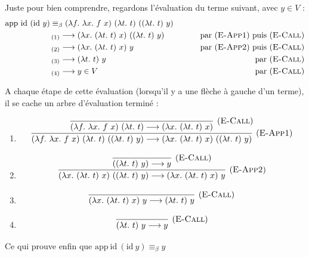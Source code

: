 \documentclass[11pt]{article}
\begin{document}
\begin{example}
    Juste pour bien comprendre, regardons l'évaluation du terme suivant, avec $y\in V$ :
    \begin{equation*}
    \begin{aligned}
        \text{app}~\text{id}~(\text{id}~y) &\equiv_\beta (\lambda f.~\lambda x.~f~x)~(\lambda t.~t)~((\lambda t.~t)~y)\\
        &\,_{(1)}\longrightarrow (\lambda x.~(\lambda t.~t)~x)~((\lambda t.~t)~y)&~~~~~~~\text{par ({\scshape{E-App1}}) puis (\scshape{E-Call})}\\
        &\,_{(2)}\longrightarrow (\lambda x.~(\lambda t.~t)~x)~y&~~~~~~~\text{par ({\scshape{E-App2}}) puis (\scshape{E-Call})}\\
        &\,_{(3)}\longrightarrow (\lambda t.~t)~y&~~~~~~~\text{par (\scshape{E-Call})}\\
        &\,_{(4)}\longrightarrow y\in V&~~~~~~~\text{par (\scshape{E-Call})}\\
    \end{aligned}
    \end{equation*}
    
    A chaque étape de cette évaluation (lorsqu'il y a une flèche à gauche d'un terme), il se cache un arbre d'évaluation terminé :
    \begin{enumerate}
        \item
        $$\infer[(\text{\scshape{E-App1}})] {
        (\lambda f.~\lambda x.~f~x)~(\lambda t.~t)~((\lambda t.~t)~y)\longrightarrow (\lambda x.~(\lambda t.~t)~x)~((\lambda t.~t)~y)
        }
        {
            \infer[(\text{\scshape{E-Call}})]
            {(\lambda f.~\lambda x.~f~x)~(\lambda t.~t)\longrightarrow (\lambda x.~(\lambda t.~t)~x)}
            {}
        }$$

        \item $$
        \infer[(\text{\scshape{E-App2}})]
        {
            (\lambda x.~(\lambda t.~t)~x)~((\lambda t.~t)~y) \longrightarrow (\lambda x.~(\lambda t.~t)~x)~y
        }
        {
            \infer[(\text{\scshape{E-Call}})]
            {
                ((\lambda t.~t)~y)\longrightarrow y
            }
            {}
        }
        $$

        \item $$
            \infer[(\text{\scshape{E-Call}})]
            {
                (\lambda x.~(\lambda t.~t)~x)~y\longrightarrow(\lambda t.~t)~y
            }
            {}
        $$

        \item $$
            \infer[(\text{\scshape{E-Call}})]
            {
                (\lambda t.~t)~y \longrightarrow y
            }
            {}
        $$
    \end{enumerate}

    Ce qui prouve enfin que $\text{app}~\text{id}~(\text{id}~y)\equiv_\beta y$
\end{example}
\end{document}
